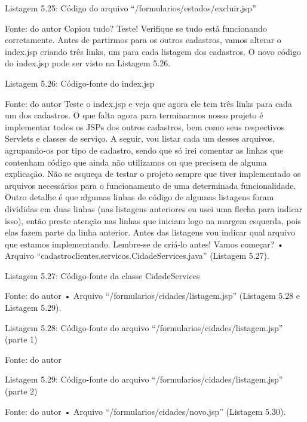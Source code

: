 Listagem 5.25: Código do arquivo ``/formularios/estados/excluir.jsp''
 
Fonte: do autor
Copiou tudo? Teste! Verifique se tudo está funcionando corretamente. Antes de partirmos para os outros cadastros, vamos alterar o index.jsp criando três links, um para cada listagem dos cadastros. O novo código do index.jsp pode ser visto na Listagem 5.26.

Listagem 5.26: Código-fonte do index.jsp
 
Fonte: do autor
Teste o index.jsp e veja que agora ele tem três links para cada um dos cadastros. O que falta agora para terminarmos nosso projeto é implementar todos os JSPs dos outros cadastros, bem como seus respectivos Servlets e classes de serviço. A seguir, vou listar cada um desses arquivos, agrupando-os por tipo de cadastro, sendo que só irei comentar as linhas que contenham código que ainda não utilizamos ou que precisem de alguma explicação. Não se esqueça de testar o projeto sempre que tiver implementado os arquivos necessários para o funcionamento de uma determinada funcionalidade. Outro detalhe é que algumas linhas de código de algumas listagens foram divididas em duas linhas (nas listagens anteriores eu usei uma flecha para indicar isso), então preste atenção nas linhas que iniciam logo na margem esquerda, pois elas fazem parte da linha anterior. Antes das listagens vou indicar qual arquivo que estamos implementando. Lembre-se de criá-lo antes! Vamos começar?
•	Arquivo ``cadastroclientes.servicos.CidadeServices.java'' (Listagem 5.27).



Listagem 5.27: Código-fonte da classe CidadeServices
 
Fonte: do autor
•	Arquivo ``/formularios/cidades/listagem.jsp'' (Listagem 5.28 e Listagem 5.29).




Listagem 5.28: Código-fonte do arquivo ``/formularios/cidades/listagem.jsp'' (parte 1)
 
Fonte: do autor











Listagem 5.29: Código-fonte do arquivo ``/formularios/cidades/listagem.jsp'' (parte 2)
 
Fonte: do autor
•	Arquivo ``/formularios/cidades/novo.jsp'' (Listagem 5.30).








